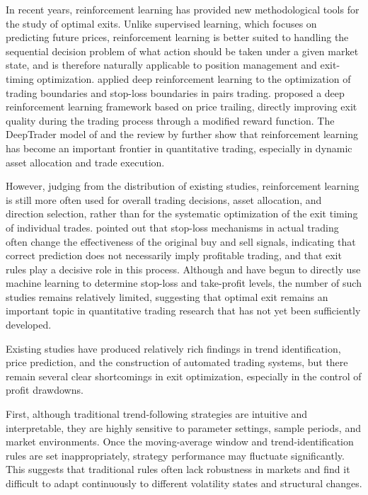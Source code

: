\documentclass[12pt]{article}
\begin{document}
In recent years, reinforcement learning has provided new methodological tools for the study of 
optimal exits. Unlike supervised learning, which focuses on predicting future prices, 
reinforcement learning is better suited to handling the sequential decision problem of what 
action should be taken under a given market state, and is therefore naturally applicable to 
position management and exit-timing optimization. \citet{KimKim2019} applied deep reinforcement 
learning to the optimization of trading boundaries and stop-loss boundaries in pairs trading. 
\citet{TsantekidisEtAl2020} proposed a deep reinforcement learning framework based on price 
trailing, directly improving exit quality during the trading process through a modified reward 
function. The DeepTrader model of \citet{WangEtAl2021} and the review by \citet{SunWangAn2023} 
further show that reinforcement learning has become an important frontier in quantitative 
trading, especially in dynamic asset allocation and trade execution.

However, judging from the distribution of existing studies, reinforcement learning is still more 
often used for overall trading decisions, asset allocation, and direction selection, rather than 
for the systematic optimization of the exit timing of individual trades. \citet{HwangEtAl2023} 
pointed out that stop-loss mechanisms in actual trading often change the effectiveness of the 
original buy and sell signals, indicating that correct prediction does not necessarily imply 
profitable trading, and that exit rules play a decisive role in this process. Although 
\citet{SivriEtAl2023} and \citet{Shawky2023} have begun to directly use machine learning to 
determine stop-loss and take-profit levels, the number of such studies remains relatively 
limited, suggesting that optimal exit remains an important topic in quantitative trading 
research that has not yet been sufficiently developed.

Existing studies have produced relatively rich findings in trend identification, price 
prediction, and the construction of automated trading systems, but there remain several clear 
shortcomings in exit optimization, especially in the control of profit drawdowns.

First, although traditional trend-following strategies are intuitive and interpretable, they are 
highly sensitive to parameter settings, sample periods, and market environments. Once the 
moving-average window and trend-identification rules are set inappropriately, strategy 
performance may fluctuate significantly. This suggests that traditional rules often lack 
robustness in markets and find it difficult to adapt continuously to different volatility 
states and structural changes.
\end{document}
